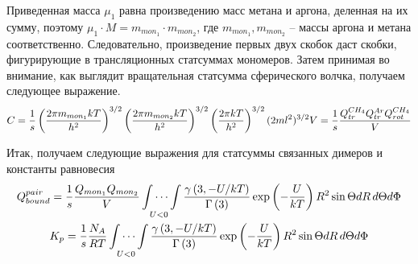 \documentclass[12pt]{article}
\newcommand{\lb}{\left(}
\newcommand{\rb}{\right)}
\begin{document}
Приведенная масса $\mu_1$ равна произведению масс метана и аргона, деленная на их сумму, поэтому $\mu_1 \cdot M = m_{mon_1} \cdot m_{mon_2}$, где $m_{mon_1}, m_{mon_2}$ -- массы аргона и метана соответственно. Следовательно, произведение первых двух скобок даст скобки, фигурирующие в трансляционных статсуммах мономеров. Затем принимая во внимание, как выглядит вращательная статсумма сферического волчка, получаем следующее выражение.
\begin{gather}
		C = \frac{1}{s} \lb \frac{2 \pi m_{mon_1} k T}{h^2} \rb^{3/2} \lb \frac{2 \pi m_{mon_2} k T}{h^2} \rb^{3/2}  \lb \frac{2\pi kT}{h^2} \rb^{3/2} (2ml^2)^{3/2} V = \frac{1}{s} \frac{Q_{tr}^{CH_4}Q_{tr}^{Ar}Q_{rot}^{CH_4}}{V} \notag
\end{gather}

Итак, получаем следующие выражения для статсуммы связанных димеров и константы равновесия 
\begin{gather}
		Q_{bound}^{pair} = \frac{1}{s} \frac{Q_{mon_1} Q_{mon_2}}{V} \idotsint\limits_{U < 0} \frac{\gamma \lb 3, - U/kT \rb}{\Gamma \lb 3 \rb} \exp \lb - \frac{U}{kT} \rb R^2 \sin\Theta d R \, d \Theta d \Phi \notag \\     
		K_p = \frac{1}{s} \frac{N_A}{R T} \idotsint\limits_{U < 0} \frac{\gamma \lb 3, - U/kT \rb}{\Gamma \lb 3 \rb} \exp \lb - \frac{U}{kT} \rb R^2 \sin\Theta d R \, d \Theta d \Phi \notag 
\end{gather}
\end{document}
